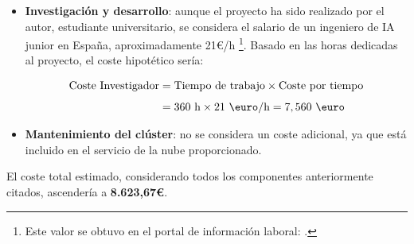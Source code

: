 \begin{itemize}
    \item \textbf{Investigación y desarrollo}: aunque el proyecto ha sido realizado por el autor, estudiante universitario, se considera el salario de un ingeniero de IA junior en España, aproximadamente 21\euro/h%
    \footnote{
        Este valor se obtuvo en el portal de información laboral: \cite{erieri2025ingenieroAI}.
    }. 
    Basado en las horas dedicadas al proyecto, el coste hipotético sería:
    
    \begin{align*}
        \textnormal{Coste Investigador} &= \textnormal{Tiempo de trabajo} \times \textnormal{Coste por tiempo} \\[1ex]
        &= 360\text{ h} \times 21 \text{ \euro/h} = 7,560 \text{ \euro}
    \end{align*}
    
    \item \textbf{Mantenimiento del clúster}: no se considera un coste adicional, ya que está incluido en el servicio de la nube proporcionado.
    
\end{itemize}

El coste total estimado, considerando todos los componentes anteriormente citados, ascendería a \textbf{8.623,67\euro}.
